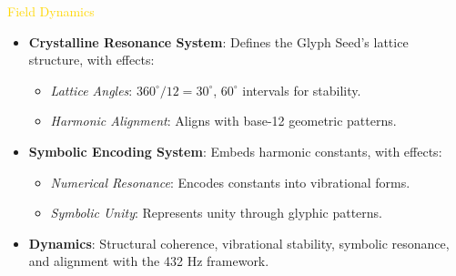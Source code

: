 \textcolor{gold}{ Field Dynamics } \\
\begin{itemize}
    \item \textbf{Crystalline Resonance System}: Defines the Glyph Seed’s lattice structure, with effects:
    \begin{itemize}\setlength{\itemsep}{0.2cm}
        \item \textit{Lattice Angles}: $360^\circ/12 = 30^\circ$, $60^\circ$ intervals for stability.
        \item \textit{Harmonic Alignment}: Aligns with base-12 geometric patterns.
    \end{itemize}
    \item \textbf{Symbolic Encoding System}: Embeds harmonic constants, with effects:
    \begin{itemize}\setlength{\itemsep}{0.2cm}
        \item \textit{Numerical Resonance}: Encodes constants into vibrational forms.
        \item \textit{Symbolic Unity}: Represents unity through glyphic patterns.
    \end{itemize}
    \item \textbf{Dynamics}: Structural coherence, vibrational stability, symbolic resonance, and alignment with the 432 Hz framework.
\end{itemize}

